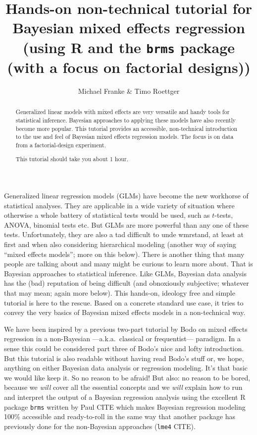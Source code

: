 \documentclass[fleqn,reqno,12pt]{article}
\title{Hands-on non-technical tutorial for Bayesian mixed effects regression \\ \normalsize{(using R and the \texttt{brms} package (with a focus on factorial designs))}}
\author{Michael Franke \& Timo Roettger}
\date{}
\begin{document}
\maketitle

\begin{abstract}
  Generalized linear models with mixed effects are very versatile and handy tools for statistical inference. Bayesian approaches to applying these models have also recently become more popular. This tutorial provides an accessible, non-technical introduction to the use and feel of Bayesian mixed effects regression models. The focus is on data from a factorial-design experiment. \\
  
  \medskip
  
  This tutorial should take you about 1 hour.
\end{abstract}

Generalized linear regression models (GLMs) have become the new workhorse of statistical analyses. They are applicable in a wide variety of situation where otherwise a whole battery of statistical tests would be used, such as $t$-tests, ANOVA, binomial tests etc. But GLMs are more powerful than any one of these tests. Unfortunately, they are also a tad difficult to unde wmrstand, at least at first and when also considering hierarchical modeling (another way of saying ``mixed effects models''; more on this below). There is another thing that many people are talking about and many might be curious to learn more about. That is Bayesian approaches to statistical inference. Like GLMs, Bayesian data analysis has the (bad) reputation of being difficult (and obnoxiously subjective; whatever that may mean; again more below). This hands-on, ideology free and simple tutorial is here to the rescue. Based on a concrete standard use case, it tries to convey the very basics of Bayesian mixed effects models in a non-technical way.

We have been inspired by a previous two-part tutorial by Bodo \citet{Winter2013:Linear-models-a} on mixed effects regression in a non-Bayesian ---a.k.a.~classical or frequentist--- paradigm. In a sense this could be considered part three of Bodo's nice and lofty introduction. But this tutorial is also readable without having read Bodo's stuff or, we hope, anything on either Bayesian data analysis or regression modeling. It's that basic we would like keep it. So no reason to be afraid! But also: no reason to be bored, because we \emph{will} cover all the essential concepts and we \emph{will} explain how to run and interpret the output of a Bayesian regression analysis using the excellent R package \texttt{brms} written by Paul CITE which makes Bayesian regression modeling 100\% accessible and ready-to-roll in the same way that another package has previously done for the non-Bayesian approaches (\texttt{lme4} CITE). 
\end{document}
